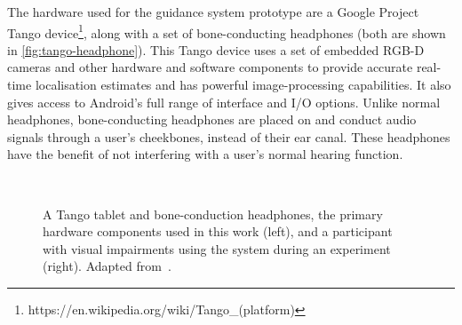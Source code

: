 \documentclass[acmsmall]{acmart}
\begin{document}
The hardware used for the guidance system prototype are a Google Project Tango device\footnote{https://en.wikipedia.org/wiki/Tango\_(platform)}, along with a set of bone-conducting headphones (both are shown in \cref{fig:tango-headphone}).
This Tango device uses a set of embedded RGB-D cameras and other hardware and software components to provide accurate real-time localisation estimates and has powerful image-processing capabilities.
It also gives access to Android's full range of interface and I/O options.
Unlike normal headphones, bone-conducting headphones are placed on and conduct audio signals through a user's cheekbones, instead of their ear canal.
These headphones have the benefit of not interfering with a user's normal hearing function.

\begin{figure}
  \centering
~
  \caption{A Tango tablet and bone-conduction headphones, the primary hardware components used in this work (left), and a participant with visual impairments using the system during an experiment (right). Adapted from~\citet{lock2019bone}.}
\end{figure}
\end{document}
